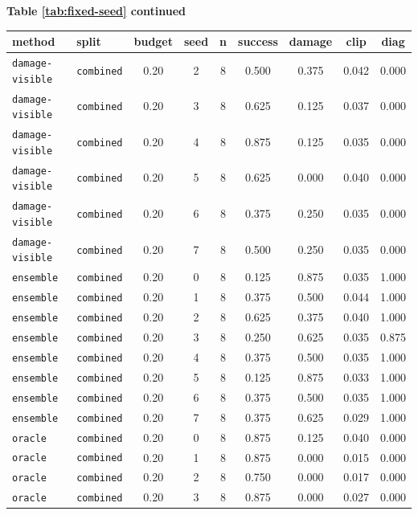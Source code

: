 \documentclass{article}
\begin{document}
\begin{center}
\textbf{Table \ref{tab:fixed-seed} continued}\\[0.4ex]
\begin{tabular}{llccccccc}
\toprule
method & split & budget & seed & n & success & damage & clip & diag \\
\midrule
\texttt{damage-visible} & \texttt{combined} & 0.20 & 2 & 8 & 0.500 & 0.375 & 0.042 & 0.000 \\
\texttt{damage-visible} & \texttt{combined} & 0.20 & 3 & 8 & 0.625 & 0.125 & 0.037 & 0.000 \\
\texttt{damage-visible} & \texttt{combined} & 0.20 & 4 & 8 & 0.875 & 0.125 & 0.035 & 0.000 \\
\texttt{damage-visible} & \texttt{combined} & 0.20 & 5 & 8 & 0.625 & 0.000 & 0.040 & 0.000 \\
\texttt{damage-visible} & \texttt{combined} & 0.20 & 6 & 8 & 0.375 & 0.250 & 0.035 & 0.000 \\
\texttt{damage-visible} & \texttt{combined} & 0.20 & 7 & 8 & 0.500 & 0.250 & 0.035 & 0.000 \\
\texttt{ensemble} & \texttt{combined} & 0.20 & 0 & 8 & 0.125 & 0.875 & 0.035 & 1.000 \\
\texttt{ensemble} & \texttt{combined} & 0.20 & 1 & 8 & 0.375 & 0.500 & 0.044 & 1.000 \\
\texttt{ensemble} & \texttt{combined} & 0.20 & 2 & 8 & 0.625 & 0.375 & 0.040 & 1.000 \\
\texttt{ensemble} & \texttt{combined} & 0.20 & 3 & 8 & 0.250 & 0.625 & 0.035 & 0.875 \\
\texttt{ensemble} & \texttt{combined} & 0.20 & 4 & 8 & 0.375 & 0.500 & 0.035 & 1.000 \\
\texttt{ensemble} & \texttt{combined} & 0.20 & 5 & 8 & 0.125 & 0.875 & 0.033 & 1.000 \\
\texttt{ensemble} & \texttt{combined} & 0.20 & 6 & 8 & 0.375 & 0.500 & 0.035 & 1.000 \\
\texttt{ensemble} & \texttt{combined} & 0.20 & 7 & 8 & 0.375 & 0.625 & 0.029 & 1.000 \\
\texttt{oracle} & \texttt{combined} & 0.20 & 0 & 8 & 0.875 & 0.125 & 0.040 & 0.000 \\
\texttt{oracle} & \texttt{combined} & 0.20 & 1 & 8 & 0.875 & 0.000 & 0.015 & 0.000 \\
\texttt{oracle} & \texttt{combined} & 0.20 & 2 & 8 & 0.750 & 0.000 & 0.017 & 0.000 \\
\texttt{oracle} & \texttt{combined} & 0.20 & 3 & 8 & 0.875 & 0.000 & 0.027 & 0.000 \\

\end{tabular}
\end{center}
\end{document}
